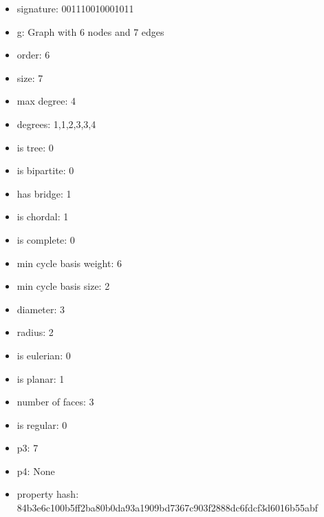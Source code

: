 \begin{itemize}
\item signature: 001110010001011
\item g: Graph with 6 nodes and 7 edges
\item order: 6
\item size: 7
\item max degree: 4
\item degrees: 1,1,2,3,3,4
\item is tree: 0
\item is bipartite: 0
\item has bridge: 1
\item is chordal: 1
\item is complete: 0
\item min cycle basis weight: 6
\item min cycle basis size: 2
\item diameter: 3
\item radius: 2
\item is eulerian: 0
\item is planar: 1
\item number of faces: 3
\item is regular: 0
\item p3: 7
\item p4: None
\item property hash: 84b3e6c100b5ff2ba80b0da93a1909bd7367c903f2888dc6fdcf3d6016b55abf
\end{itemize}
\newpage
\begin{figure}
\end{figure}
